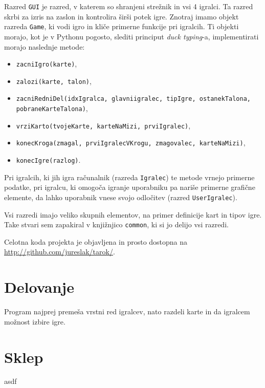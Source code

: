 \documentclass{article}
\begin{document}
Razred \texttt{GUI} je razred, v katerem so shranjeni strežnik in vsi 4 igralci. Ta razred skrbi za izris na zaslon in kontrolira širši potek igre. Znotraj imamo objekt razreda \texttt{Game}, ki vodi igro in kliče primerne funkcije pri igralcih. Ti objekti morajo, kot je v Pythonu pogosto, slediti principut \emph{duck typing}-a, implementirati morajo naslednje metode:
\begin{itemize}
  \item \texttt{zacniIgro(karte)},
  \item \texttt{zalozi(karte, talon)},
  \item \texttt{zacniRedniDel(idxIgralca, glavniigralec, tipIgre, ostanekTalona, pobraneKarteTalona)},
  \item \texttt{vrziKarto(tvojeKarte, karteNaMizi, prviIgralec)},
  \item \texttt{konecKroga(zmagal, prviIgralecVKrogu, zmagovalec, karteNaMizi)},
  \item \texttt{konecIgre(razlog)}.
\end{itemize}
Pri igralcih, ki jih igra računalnik (razreda \texttt{Igralec}) te metode vrnejo primerne podatke, pri igralcu, ki omogoča igranje uporabniku pa nariše primerne grafične elemente, da lahko uporabnik vnese svojo odločitev (razred \texttt{UserIgralec}).

Vsi razredi imajo veliko skupnih elementov, na primer definicije kart in tipov igre. Take stvari sem zapakiral v knjižnjico \texttt{common}, ki  si jo delijo vsi razredi.

Celotna koda projekta je objavljena in prosto dostopna na \url{http://github.com/jureslak/tarok/}.

\section{Delovanje}
Program najprej premeša vrstni red igralcev, nato razdeli karte in da igralcem možnost izbire igre.

\section{Sklep}
asdf
\end{document}
